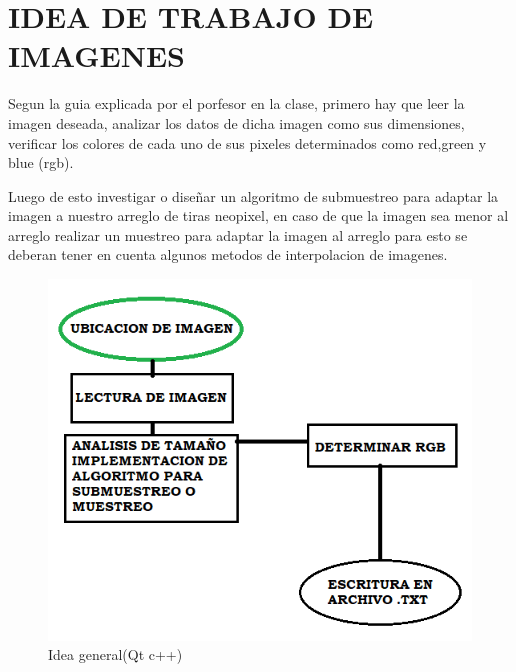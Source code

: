 \documentclass{article}
\begin{document}
\section{IDEA DE TRABAJO DE IMAGENES}
Segun la guia explicada por el porfesor en la clase, primero hay que leer la imagen deseada, analizar los datos de dicha imagen como sus dimensiones, verificar los colores de cada uno de sus pixeles determinados como red,green y blue (rgb).

Luego de esto investigar o diseñar un algoritmo de submuestreo para adaptar la imagen a nuestro arreglo de tiras neopixel, en caso de que la imagen sea menor al arreglo realizar un muestreo para adaptar la imagen al arreglo para esto se deberan tener en cuenta algunos metodos de interpolacion de imagenes.\\
    \begin{figure}[h]
    \includegraphics[width=13cm]{diagrama2.png}
    \centering
    \caption{Idea general(Qt c++)}
    \label{fig:diagrama2}
    \end{figure}



\end{document}
